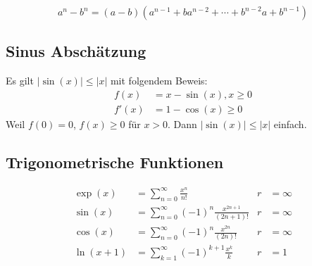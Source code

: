 \documentclass[8pt]{extarticle}
\def\sumk{\sum_{k=1}^\infty}
\def\sumn{\sum_{n=0}^\infty}
\begin{document}
\begin{multicols*}{3}
$$
  a^n - b^n = (a-b)(a^{n-1} + ba^{n-2} + \cdots + b^{n-2}a + b^{n-1})
$$

\subsection{Sinus Abschätzung}

Es gilt $|\sin(x)| \leq |x|$ mit folgendem Beweis:
\begin{align*}
  f(x) &= x - \sin(x), x \geq 0 \\
  f'(x) &= 1 - \cos(x) \geq 0
\end{align*}
Weil $f(0) = 0$, $f(x) \geq 0$ für $x > 0$. Dann $|\sin(x)| \leq |x|$ einfach. 



\subsection{Trigonometrische Funktionen}
\begin{align*}
\exp(x) &= \sumn \frac{x^n}{n!} & r &= \infty \\
\sin(x) &= \sumn (-1)^n \frac{x^{2n + 1}}{(2n + 1)!} & r &= \infty \\
\cos(x) &= \sumn (-1)^n \frac{x^{2n}}{(2n)!} & r &= \infty \\
\ln(x + 1) &= \sumk (-1)^{k+1} \frac{x^k}{k} & r &= 1
\end{align*}


\end{multicols*}
\end{document}
